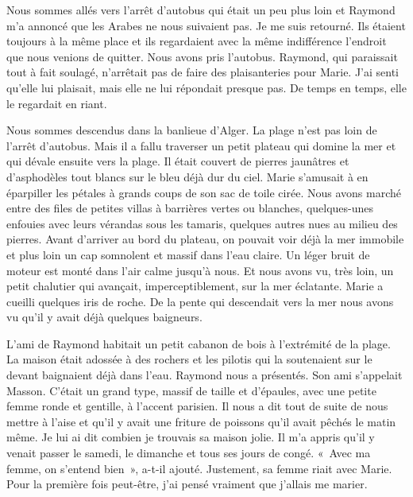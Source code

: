 \documentclass[french,twoside]{book} %
\begin{document}
Nous sommes allés vers l’arrêt d’autobus qui était un peu plus loin et Raymond m’a annoncé que les Arabes ne nous suivaient pas. Je me suis retourné. Ils étaient toujours à la même place et ils regardaient avec la même indifférence l’endroit que nous venions de quitter. Nous avons pris l’autobus. Raymond, qui paraissait tout à fait soulagé, n’arrêtait pas de faire des plaisanteries pour Marie. J'ai senti qu’elle lui plaisait, mais elle ne lui répondait presque pas. De temps en temps, elle le regardait en riant.\par
Nous sommes descendus dans la banlieue d’Alger. La plage n’est pas loin de l’arrêt d’autobus. Mais il a fallu traverser un petit plateau qui domine la mer et qui dévale ensuite vers la plage. Il était couvert de pierres jaunâtres et d’asphodèles tout blancs sur le bleu déjà dur du ciel. Marie s’amusait à en éparpiller les pétales à grands coups de son sac de toile cirée. Nous avons marché entre des files de petites villas à barrières vertes ou blanches, quelques-unes enfouies avec leurs vérandas sous les tamaris, quelques autres nues au milieu des pierres. Avant d’arriver au bord du plateau, on pouvait voir déjà la mer immobile et plus loin un cap somnolent et massif dans l’eau claire. Un léger bruit de moteur est monté dans l’air calme jusqu’à nous. Et nous avons vu, très loin, un petit chalutier qui avançait, imperceptiblement, sur la mer éclatante. Marie a cueilli quelques iris de roche. De la pente qui descendait vers la mer nous avons vu qu’il y avait déjà quelques baigneurs.\par
L'ami de Raymond habitait un petit cabanon de bois à l’extrémité de la plage. La maison était adossée à des rochers et les pilotis qui la soutenaient sur le devant baignaient déjà dans l’eau. Raymond nous a présentés. Son ami s’appelait Masson. C'était un grand type, massif de taille et d’épaules, avec une petite femme ronde et gentille, à l’accent parisien. Il nous a dit tout de suite de nous mettre à l’aise et qu’il y avait une friture de poissons qu’il avait pêchés le matin même. Je lui ai dit combien je trouvais sa maison jolie. Il m’a appris qu’il y venait passer le samedi, le dimanche et tous ses jours de congé. « Avec ma femme, on s’entend bien », a-t-il ajouté. Justement, sa femme riait avec Marie. Pour la première fois peut-être, j’ai pensé vraiment que j’allais me marier.\par
\end{document}

